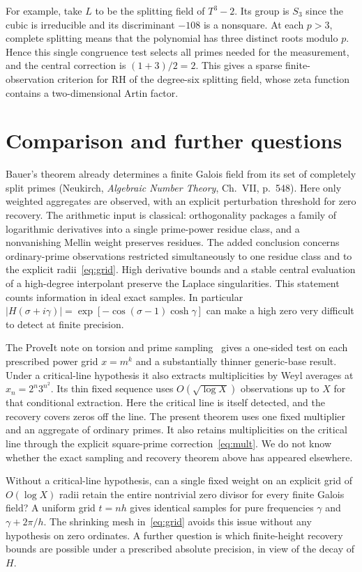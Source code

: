 \documentclass[11pt]{article}
\begin{document}
For example, take $L$ to be the splitting field of $T^3-2$. Its group is $S_3$ since the cubic is irreducible and its discriminant $-108$ is a nonsquare. At each $p>3$, complete splitting means that the polynomial has three distinct roots modulo $p$. Hence this single congruence test selects all primes needed for the measurement, and the central correction is $(1+3)/2=2$. This gives a sparse finite-observation criterion for RH of the degree-six splitting field, whose zeta function contains a two-dimensional Artin factor.

\section{Comparison and further questions}

Bauer's theorem already determines a finite Galois field from its set of completely split primes (Neukirch, \emph{Algebraic Number Theory}, Ch.~VII, p.~548). Here only weighted aggregates are observed, with an explicit perturbation threshold for zero recovery. The arithmetic input is classical: orthogonality packages a family of logarithmic derivatives into a single prime-power residue class, and a nonvanishing Mellin weight preserves residues. The added conclusion concerns ordinary-prime observations restricted simultaneously to one residue class and to the explicit radii~\eqref{eq:grid}. High derivative bounds and a stable central evaluation of a high-degree interpolant preserve the Laplace singularities. This statement counts information in ideal exact samples. In particular $|H(\sigma+i\gamma)|=\exp[-\cos(\sigma-1)\cosh\gamma]$ can make a high zero very difficult to detect at finite precision.

The ProveIt note on torsion and prime sampling~\cite{proveit} gives a one-sided test on each prescribed power grid $x=m^k$ and a substantially thinner generic-base result. Under a critical-line hypothesis it also extracts multiplicities by Weyl averages at $x_n=2^n3^{n^2}$. Its thin fixed sequence uses $O(\sqrt{\log X})$ observations up to $X$ for that conditional extraction. Here the critical line is itself detected, and the recovery covers zeros off the line. The present theorem uses one fixed multiplier and an aggregate of ordinary primes. It also retains multiplicities on the critical line through the explicit square-prime correction~\eqref{eq:mult}. We do not know whether the exact sampling and recovery theorem above has appeared elsewhere.

Without a critical-line hypothesis, can a single fixed weight on an explicit grid of $O(\log X)$ radii retain the entire nontrivial zero divisor for every finite Galois field? A uniform grid $t=nh$ gives identical samples for pure frequencies $\gamma$ and $\gamma+2\pi/h$. The shrinking mesh in~\eqref{eq:grid} avoids this issue without any hypothesis on zero ordinates. A further question is which finite-height recovery bounds are possible under a prescribed absolute precision, in view of the decay of $H$.
\end{document}

